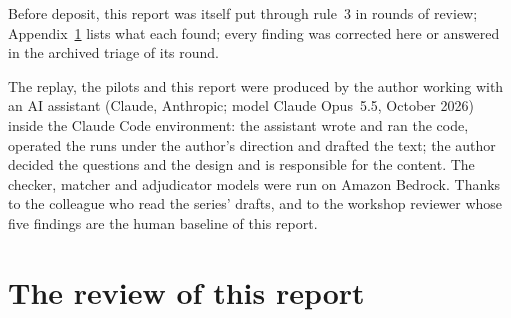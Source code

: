 \documentclass[11pt]{article}
\begin{document}
Before deposit, this report was itself put through rule~3 in rounds of review; Appendix~\ref{app:review} lists what
each found; every finding was corrected here or answered in the archived triage of its round.

The replay, the pilots and this report
were produced by the author working with an AI assistant (Claude, Anthropic; model Claude
Opus~5.5, October 2026) inside the Claude Code environment: the assistant wrote and ran the code, operated the runs under the
author's direction and drafted the text; the author decided the questions and the design and is responsible for the content. The
checker, matcher and adjudicator models were run on Amazon Bedrock. Thanks to the colleague who read the series' drafts, and to the
workshop reviewer whose five findings are the human baseline of this report.




\appendix
\section{The review of this report}
\label{app:review}
\end{document}
